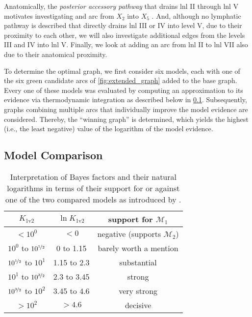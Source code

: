 \documentclass[twocolumn]{article}
\begin{document}
Anatomically, the \emph{posterior accessory pathway} that drains \gls{lnl} II through \gls{lnl} V motivates investigating and arc from $X_2$ into $X_5$ \cite{lengele_anatomical_2007}. And, although no lymphatic pathway is described that directly drains \gls{lnl} III or IV into level V, due to their proximity to each other, we will also investigate additional edges from the levels III and IV into \gls{lnl} V. Finally, we look at adding an arc from \gls{lnl} II to \gls{lnl} VII also due to their anatomical proximity.

To determine the optimal graph, we first consider six models, each with one of the six green candidate arcs of \cref{fig:extended_graph} added to the base graph. Every one of these models was evaluated by computing an approximation to its evidence via thermodynamic integration as described below in \cref{subsec:complete_model:comparison}. Subsequently, graphs combining multiple arcs that individually improve the model evidence are considered. Thereby, the ``winning graph'' is determined, which yields the highest (i.e., the least negative) value of the logarithm of the model evidence.

\subsection{Model Comparison}
\label{subsec:complete_model:comparison}

\begin{table}[b]
\centering
\begin{tabular}{|c|c|c|}
    \hline
    $K_\text{1v2}$ & $\ln{K_\text{1v2}}$ & support for $\mathcal{M}_1$ \\
    \hline
    $< 10^0$ & $< 0$ & negative (supports $\mathcal{M}_2$) \\
    $10^0$ to $10^{\nicefrac{1}{2}}$ & 0 to 1.15 & barely worth a mention \\
    $10^{\nicefrac{1}{2}}$ to $10^1$ & 1.15 to 2.3 & substantial \\
    $10^1$ to $10^{\nicefrac{3}{2}}$ & 2.3 to 3.45 & strong \\
    $10^{\nicefrac{3}{2}}$ to $10^2$ & 3.45 to 4.6 & very strong \\
    $> 10^2$ & $> 4.6$ & decisive \\
    \hline
\end{tabular}
\caption{Interpretation of Bayes factors and their natural logarithms in terms of their support for or against one of the two compared models as introduced by \cite{jeffreys_theory_1998}.}
\label{table:bayes_factor}
\end{table}
\end{document}
